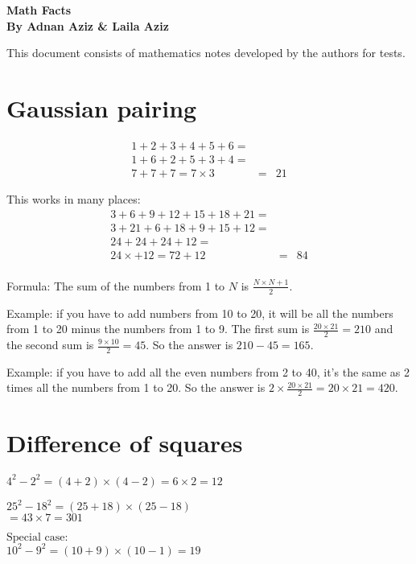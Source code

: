 \documentclass[fullpage,twocolumn]{article}
\begin{document}

\begin{center}
{\Large \bf Math Facts} \\
{\bf By Adnan Aziz \& Laila Aziz}

\end{center}


This document consists of mathematics notes developed by the authors for
tests.



\section{Gaussian pairing}
{\color{blue}
\begin{eqnarray*}
1 + 2 + 3 + 4 + 5 + 6 = \\
1 + 6 + 2 + 5 + 3 + 4 = \\
7 + 7 + 7 = 7 \times 3 & = & 21 
\end{eqnarray*}
}

This works in many places:
\begin{eqnarray*}
3 + 6 + 9 + 12 + 15 + 18 + 21 = \\
3 + 21 + 6 + 18 + 9 + 15 + 12 = \\
24 + 24 + 24 + 12 = \\
24\times + 12 = 72 + 12 & = & 84 \\
\end{eqnarray*}

Formula: The sum of the numbers from 1 to $N$ is $\frac{N \times {N+1}}{2}$.

Example: if you have to add numbers from 10 to 20, it will
be all the numbers from 1 to 20 minus the numbers from 1 to 9.
The first sum is $\frac{20 \times 21}{2} = 210$ and the second
sum is $\frac{9 \times 10 }{2} = 45$. So the answer
is $210 - 45 = 165$.

Example: if you have to add all the even numbers from 2 to 40,
it's the same as 2 times all the numbers from 1 to 20.
So the answer is $2 \times \frac{20\times 21}{2} = 20\times 21 = 420$.


\section{Difference of squares}
${4^2 - 2^2 = (4 + 2) \times (4 - 2) =  6 \times 2 = 12  }$

$25^2 - 18^2 = (25+18)\times (25 - 18)$ \\
$ = 43\times 7 = 301$

$\mbox{Special case:}\;$\\
$10^2 - 9^2 = (10+9) \times (10-1) = 19$
\end{document}
